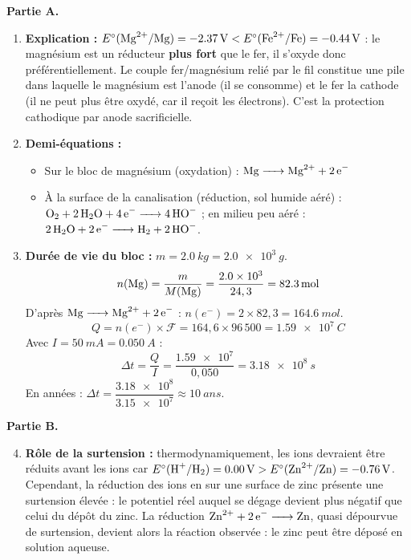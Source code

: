 \documentclass[11pt]{article}
\newcommand{\cle}[1]{{\popxbold\color{popdark}#1}}
\begin{document}
\begin{corrige}
\textbf{Partie A.}
\begin{enumerate}
\item \textbf{Explication :} $E^\circ(\ce{Mg^2+}/\ce{Mg}) = \SI{-2,37}{V} < E^\circ(\ce{Fe^2+}/\ce{Fe}) = \SI{-0,44}{V}$ : le magnésium est un réducteur \textbf{plus fort} que le fer, il s'oxyde donc préférentiellement. Le couple fer/magnésium relié par le fil constitue une pile dans laquelle le magnésium est l'anode (il se consomme) et le fer la cathode (il ne peut plus être oxydé, car il reçoit les électrons). C'est la \cle{protection cathodique par anode sacrificielle}.

\item \textbf{Demi-équations :}
\begin{itemize}
\item Sur le bloc de magnésium (oxydation) : $\ce{Mg -> Mg^2+ + 2e-}$
\item À la surface de la canalisation (réduction, sol humide aéré) : $\ce{O2 + 2H2O + 4e- -> 4HO-}$ ; en milieu peu aéré : $\ce{2H2O + 2e- -> H2 + 2HO-}$.
\end{itemize}

\item \textbf{Durée de vie du bloc :} $m = \SI{2,0}{kg} = \SI{2,0e3}{g}$.
\[ n(\ce{Mg}) = \frac{m}{M(\ce{Mg})} = \frac{\num{2,0e3}}{24,3} = \SI{82,3}{mol} \]
D'après $\ce{Mg -> Mg^2+ + 2e-}$ : $n(e^-) = 2 \times 82,3 = \SI{164,6}{mol}$.
\[ Q = n(e^-) \times \mathcal{F} = 164,6 \times 96\,500 = \SI{1,59e7}{C} \]
Avec $I = \SI{50}{mA} = \SI{0,050}{A}$ :
\[ \Delta t = \frac{Q}{I} = \frac{\num{1,59e7}}{0,050} = \SI{3,18e8}{s} \]
En années : $\Delta t = \dfrac{\num{3,18e8}}{\num{3,15e7}} \approx \boxed{\SI{10}{ans}}$.
\end{enumerate}

\textbf{Partie B.}
\begin{enumerate}
\setcounter{enumi}{3}
\item \textbf{Rôle de la surtension :} thermodynamiquement, les ions  devraient être réduits avant les ions  car $E^\circ(\ce{H+}/\ce{H2}) = \SI{0,00}{V} > E^\circ(\ce{Zn^2+}/\ce{Zn}) = \SI{-0,76}{V}$. Cependant, la réduction des ions  en  sur une surface de zinc présente une \cle{surtension} élevée : le potentiel réel auquel  se dégage devient plus négatif que celui du dépôt du zinc. La réduction $\ce{Zn^2+ + 2e- -> Zn}$, quasi dépourvue de surtension, devient alors la réaction observée : le zinc peut être déposé en solution aqueuse.


\end{enumerate}
\end{corrige}
\end{document}
